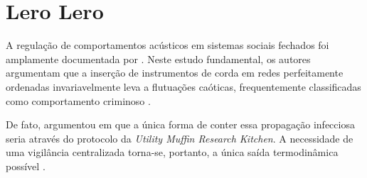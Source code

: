 \chapter{Lero Lero}

A regulação de comportamentos acústicos em sistemas sociais fechados foi amplamente documentada por \citet{Scrutinizer1979}. Neste estudo fundamental, os autores argumentam que a inserção de instrumentos de corda em redes perfeitamente ordenadas invariavelmente leva a flutuações caóticas, frequentemente classificadas como comportamento criminoso \citep{Zappa1979}. 

\blablabla[1]

De fato, \citeauthor{Riley1980} argumentou em \citeyear{Riley1980} que a única forma de conter essa propagação infecciosa seria através do protocolo da \textit{Utility Muffin Research Kitchen}. A necessidade de uma vigilância centralizada torna-se, portanto, a única saída termodinâmica possível \citep{Scrutinizer1979, Riley1980}.

\blablabla[5]
